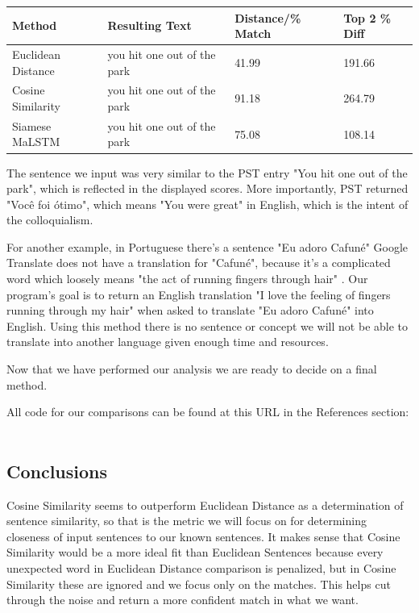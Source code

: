 \documentclass[runningheads]{llncs}
\begin{document}
\vspace{10 mm}
	\begin{minipage}{\linewidth}
			\begin{tabular}{| l | l | l | l |}
			  \hline			
			  Method & Resulting Text & Distance/\% Match & Top 2 \% Diff \\
			  \hline			
			  Euclidean Distance & you hit one out of the park & 41.99 & 191.66 \\
			  \hline			
			  Cosine Similarity & you hit one out of the park & 91.18 & 264.79 \\
			  \hline  
			  Siamese MaLSTM & you hit one out of the park & 75.08 & 108.14 \\
			  \hline
			\end{tabular}
	\end{minipage}
	\afterpage{\clearpage}
\vspace{10 mm}

	The sentence we input was very similar to the PST entry "You hit one out of the park", which is reflected in the displayed scores. More importantly, PST returned "Você foi ótimo", which means "You were great" in English, which is the intent of the colloquialism. 

	For another example, in Portuguese there's a sentence "Eu adoro Cafuné" Google Translate does not have a translation for "Cafuné", because it's a complicated word which loosely means "the act of running fingers through hair" . Our program's goal is to return an English translation "I love the feeling of fingers running through my hair" when asked to translate "Eu adoro Cafuné" into English. Using this method there is no sentence or concept we will not be able to translate into another language given enough time and resources.

	Now that we have performed our analysis we are ready to decide on a final method.

	All code for our comparisons can be found at this URL in the References section: ~\cite{ref_url20}
	
	\subsection{Conclusions}
	Cosine Similarity seems to outperform Euclidean Distance as a determination of sentence similarity, so that is the metric we will focus on for determining closeness of input sentences to our known sentences. It makes sense that Cosine Similarity would be a more ideal fit than Euclidean Sentences because every unexpected word in Euclidean Distance comparison is penalized, but in Cosine Similarity these are ignored and we focus only on the matches. This helps cut through the noise and return a more confident match in what we want.
\end{document}
